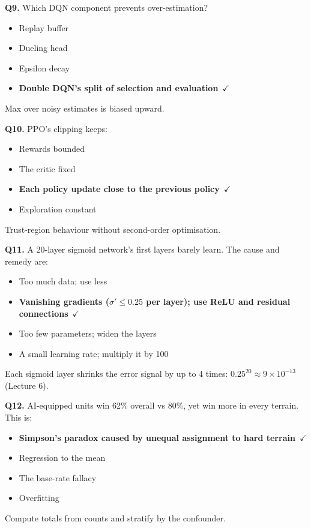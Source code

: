 \documentclass[11pt]{article}
\begin{document}
{\noindent\textbf{Q9.} Which DQN component prevents over-estimation?\begin{itemize}[leftmargin=2.2em,itemsep=0pt,topsep=1pt]\item[A.] Replay buffer\item[B.] Dueling head\item[C.] Epsilon decay\item[\textbf{D.}] \textbf{Double DQN's split of selection and evaluation}~{\color{GrnN}$\checkmark$}\end{itemize} Max over noisy estimates is biased upward.\par\medskip

\noindent\textbf{Q10.} PPO's clipping keeps:\begin{itemize}[leftmargin=2.2em,itemsep=0pt,topsep=1pt]\item[A.] Rewards bounded\item[B.] The critic fixed\item[\textbf{C.}] \textbf{Each policy update close to the previous policy}~{\color{GrnN}$\checkmark$}\item[D.] Exploration constant\end{itemize} Trust-region behaviour without second-order optimisation.\par\medskip

\noindent\textbf{Q11.} A 20-layer sigmoid network's first layers barely learn. The cause and remedy are:\begin{itemize}[leftmargin=2.2em,itemsep=0pt,topsep=1pt]\item[A.] Too much data; use less\item[\textbf{B.}] \textbf{Vanishing gradients ($\sigma'\le0.25$ per layer); use ReLU and residual connections}~{\color{GrnN}$\checkmark$}\item[C.] Too few parameters; widen the layers\item[D.] A small learning rate; multiply it by 100\end{itemize} Each sigmoid layer shrinks the error signal by up to 4 times: $0.25^{20}\approx9\times10^{-13}$ (Lecture 6).\par\medskip

\noindent\textbf{Q12.} AI-equipped units win 62\% overall vs 80\%, yet win more in every terrain. This is:\begin{itemize}[leftmargin=2.2em,itemsep=0pt,topsep=1pt]\item[\textbf{A.}] \textbf{Simpson's paradox caused by unequal assignment to hard terrain}~{\color{GrnN}$\checkmark$}\item[B.] Regression to the mean\item[C.] The base-rate fallacy\item[D.] Overfitting\end{itemize} Compute totals from counts and stratify by the confounder.\par\medskip

}
\end{document}

